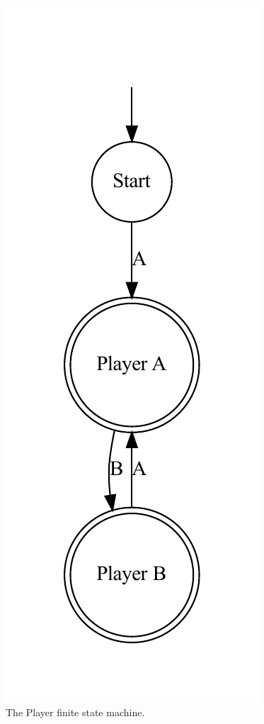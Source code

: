 \documentclass[sigplan,anonymous,review]{acmart}
\begin{document}
\begin{figure}
    \centering
    \includegraphics[width=0.35\linewidth]{figures/nimexample/playerFSM.pdf}
    \caption{The Player finite state machine.}
    \label{fig:nimPlayerFSM}
\end{figure}
\end{document}

